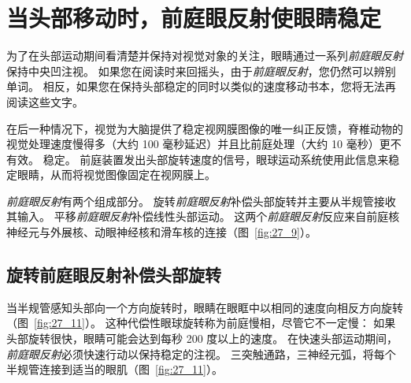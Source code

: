 \section{当头部移动时，前庭眼反射使眼睛稳定}

为了在头部运动期间看清楚并保持对视觉对象的关注，眼睛通过一系列\textit{前庭眼反射}保持中央凹注视。
如果您在阅读时来回摇头，由于\textit{前庭眼反射}，您仍然可以辨别单词。
相反，如果您在保持头部稳定的同时以类似的速度移动书本，您将无法再阅读这些文字。


在后一种情况下，视觉为大脑提供了稳定视网膜图像的唯一纠正反馈，脊椎动物的视觉处理速度慢得多（大约 100 毫秒延迟）并且比前庭处理（大约 10 毫秒）更不有效。 稳定。
前庭装置发出头部旋转速度的信号，眼球运动系统使用此信息来稳定眼睛，从而将视觉图像固定在视网膜上。


\textit{前庭眼反射}有两个组成部分。
旋转\textit{前庭眼反射}补偿头部旋转并主要从半规管接收其输入。
平移\textit{前庭眼反射}补偿线性头部运动。
这两个\textit{前庭眼反射}反应来自前庭核神经元与外展核、动眼神经核和滑车核的连接（图~\ref{fig:27_9}）。



\subsection{旋转前庭眼反射补偿头部旋转}

当半规管感知头部向一个方向旋转时，眼睛在眼眶中以相同的速度向相反方向旋转（图~\ref{fig:27_11}）。 
这种代偿性眼球旋转称为前庭慢相，尽管它不一定慢：
如果头部旋转很快，眼睛可能会达到每秒 200 度以上的速度。
在快速头部运动期间，\textit{前庭眼反射}必须快速行动以保持稳定的注视。
三突触通路，三神经元弧，将每个半规管连接到适当的眼肌（图~\ref{fig:27_11}）。


